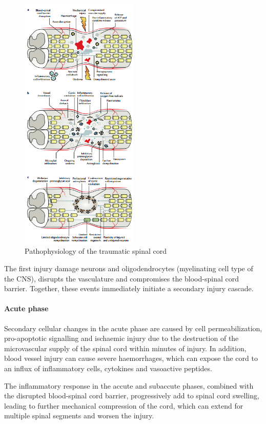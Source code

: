 \documentclass[12pt,article,oneside,a4paper]{memoir}
\begin{document}
\begin{figure}
  \centering
  \includegraphics[width=0.5\textwidth]{imgs/SCI-timeline.png}
  \caption{Pathophysiology of the traumatic spinal cord}
  \label{fig:SCI-pathophysiology}
\end{figure}

The first injury damage neurons and oligodendrocytes (myelinating cell type of
the CNS), disrupts the vasculature and compromises the blood-spinal cord
barrier. Together, these events immediately initiate a secondary injury
cascade.

\paragraph{Acute phase}
Secondary cellular changes in the acute phase are caused by cell
permeabilization, pro-apoptotic signalling and ischaemic injury due to the
destruction of the microvascular supply of the spinal cord within minutes of
injury. In addition, blood vessel injury can cause severe haemorrhages, which
can expose the cord to an influx of inflammatory cells, cytokines and
vasoactive peptides.

The inflammatory response in the accute and subaccute phases, combined with the
disrupted blood-spinal cord barrier, progressively add to spinal cord swelling,
leading to further mechanical compression of the cord, which can extend for
multiple spinal segments and worsen the injury.
\end{document}
